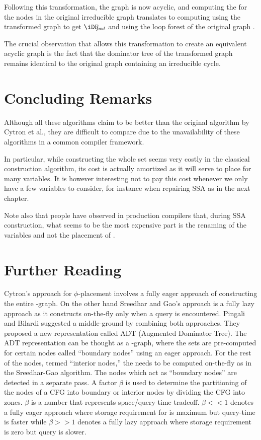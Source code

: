 {Following this transformation, the graph is now acyclic, and computing the \iDF for the nodes in the original irreducible graph translates to computing \iDF using the transformed graph to get $\iDFfwd$ and using the loop forest of the original graph .

The crucial observation that allows this transformation to create an equivalent acyclic graph is the fact that the dominator tree of the transformed graph remains identical to the original graph containing an irreducible cycle. 

\section{Concluding Remarks}

Although all these algorithms claim to be better than the original algorithm by Cytron et al., they are difficult to compare due to the unavailability of these algorithms in a common compiler framework. 

In particular, while constructing the whole \iDF set seems very costly in the classical construction algorithm, its cost is actually amortized as it will serve to place \phifuns for many variables.
It is however interesting not to pay this cost whenever we only have a few variables to consider, for instance when repairing SSA as in the next chapter.
 
Note also that people have observed in production compilers that, during SSA construction, what seems to be the most expensive part is the renaming of the variables and not the placement of \phifuns.



\section{Further Reading}

Cytron's approach for $\phi$-placement involves a fully eager approach of constructing the entire \DF-graph. 
On the other hand Sreedhar and Gao's approach is a fully lazy approach as it constructs \DF on-the-fly only when a query is encountered. 
Pingali and Bilardi \cite{bilardi} suggested a middle-ground by combining both approaches. 
They proposed a new representation called ADT (Augmented Dominator Tree). 
The ADT representation can be thought as a \DJ-graph, where the \DF sets are pre-computed for certain nodes called ``boundary nodes'' using an eager approach. 
For the rest of the nodes, termed ``interior nodes,'' the \DF needs to be computed on-the-fly as in the Sreedhar-Gao algorithm. 
The nodes which act as ``boundary nodes'' are detected in a separate pass. 
A factor $\beta$ is used to determine the partitioning of the nodes of a CFG into boundary or interior nodes by dividing the CFG into zones. 
$\beta$ is a number that represents space/query-time tradeoff. 
$\beta <\!\!< 1$ denotes a fully eager approach where storage requirement for \DF is maximum but query-time is faster while $\beta >\!\!> 1$ denotes a fully lazy approach where storage requirement is zero but query is slower.

}
